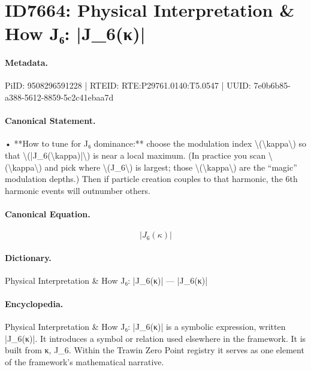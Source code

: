 \section*{ID7664: Physical Interpretation \& How J₆: |J\_6(κ)|}
\paragraph{Metadata.}
PiID: 9508296591228 | RTEID: RTE:P29761.0140:T5.0547 | UUID: 7e0b6b85-a388-5612-8859-5c2c41ebaa7d

\paragraph{Canonical Statement.}
• **How to tune for J₆ dominance:** choose the modulation index \textbackslash{}(\textbackslash{}kappa\textbackslash{}) so that \textbackslash{}(|J\_6(\textbackslash{}kappa)|\textbackslash{}) is near a local maximum. (In practice you scan \textbackslash{}(\textbackslash{}kappa\textbackslash{}) and pick where \textbackslash{}(J\_6\textbackslash{}) is largest; those \textbackslash{}(\textbackslash{}kappa\textbackslash{}) are the “magic” modulation depths.) Then if particle creation couples to that harmonic, the 6th harmonic events will outnumber others.

\paragraph{Canonical Equation.}
\[
|J_6(\kappa)|
\]

\paragraph{Dictionary.}
Physical Interpretation \& How J₆: |J\_6(κ)| — |J\_6(κ)|

\paragraph{Encyclopedia.}
Physical Interpretation \& How J₆: |J\_6(κ)| is a symbolic expression, written |J\_6(κ)|. It introduces a symbol or relation used elsewhere in the framework. It is built from κ, J\_6. Within the Trawin Zero Point registry it serves as one element of the framework's mathematical narrative.
